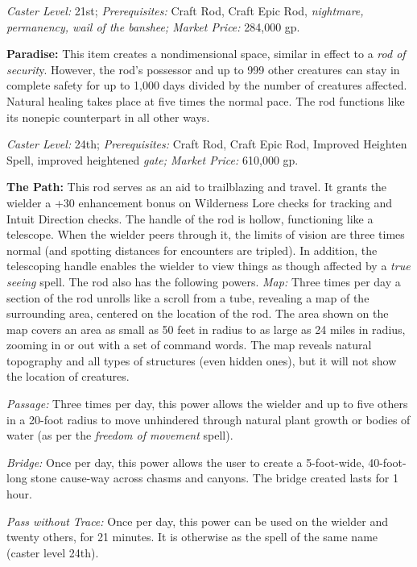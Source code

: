 \documentclass{article}
\begin{document}
\textit{Caster Level: }21st; \textit{Prerequisites: }Craft Rod, Craft Epic Rod, 
\textit{nightmare, permanency, wail of the banshee; Market Price: }284,000 gp. 

\textbf{Paradise: }This item creates a nondimensional space, similar in effect 
to a \textit{rod of securit}y. However, the rod's possessor and up to 999 other 
creatures can stay in complete safety for up to 1,000 days divided by the number 
of creatures affected. Natural healing takes place at five times the normal pace. 
The rod functions like its nonepic counterpart in all other ways.

\textit{Caster Level: }24th; \textit{Prerequisites: }Craft Rod, Craft Epic Rod, 
Improved Heighten Spell, improved heightened \textit{gate; Market Price: }610,000 
gp. 

\textbf{The Path: }This rod serves as an aid to trailblazing and travel. It grants 
the wielder a +30 enhancement bonus on Wilderness Lore checks for tracking and 
Intuit Direction checks. The handle of the rod is hollow, functioning like a telescope. 
When the wielder peers through it, the limits of vision are three times normal 
(and spotting distances for encounters are tripled). In addition, the telescoping 
handle enables the wielder to view things as though affected by a \textit{true 
seeing }spell. The rod also has the following powers. \textit{Map: }Three times 
per day a section of the rod unrolls like a scroll from a tube, revealing a map 
of the surrounding area, centered on the location of the rod. The area shown on 
the map covers an area as small as 50 feet in radius to as large as 24 miles in 
radius, zooming in or out with a set of command words. The map reveals natural 
topography and all types of structures (even hidden ones), but it will not show 
the location of creatures. 

\textit{Passage: }Three times per day, this power allows the wielder and up to 
five others in a 20-foot radius to move unhindered through natural plant growth 
or bodies of water (as per the \textit{freedom of movement }spell). 

\textit{Bridge: }Once per day, this power allows the user to create a 5-foot-wide, 
40-foot-long stone cause-way across chasms and canyons. The bridge created lasts 
for 1 hour.

\textit{Pass without Trace: }Once per day, this power can be used on the wielder 
and twenty others, for 21 minutes. It is otherwise as the spell of the same name 
(caster level 24th). 
\end{document}
